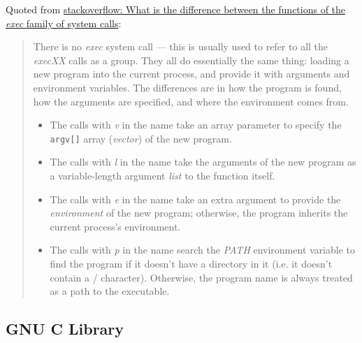 \begin{frame}
  \begin{block}{}
    \begin{center}
    \end{center}
  \end{block}
  \qquad{}
\end{frame}

Quoted from
\href{https://stackoverflow.com/questions/20823371/what-is-the-difference-between-the-functions-of-the-exec-family-of-system-calls}{
  stackoverflow: What is the difference between the functions of the \emph{exec} family of system calls}:

\begin{quote}
  There is no \emph{exec} system call --- this is usually used to refer to all the
  \emph{execXX} calls as a group. They all do essentially the same thing: loading a new
  program into the current process, and provide it with arguments and environment
  variables. The differences are in how the program is found, how the arguments are
  specified, and where the environment comes from.

  \begin{itemize}
  \item The calls with \emph{v} in the name take an array parameter to specify the
    \texttt{argv[]} array (\emph{vector}) of the new program.
  \item The calls with \emph{l} in the name take the arguments of the new program as a
    variable-length argument \emph{list} to the function itself.
  \item The calls with \emph{e} in the name take an extra argument to provide the
    \emph{environment} of the new program; otherwise, the program inherits the current
    process's environment.
  \item The calls with \emph{p} in the name search the \emph{PATH} environment variable to
    find the program if it doesn't have a directory in it (i.e. it doesn't contain a /
    character). Otherwise, the program name is always treated as a path to the executable.
  \end{itemize}
\end{quote}

\subsection{GNU C Library}
\label{sec:gnu-c-library}

